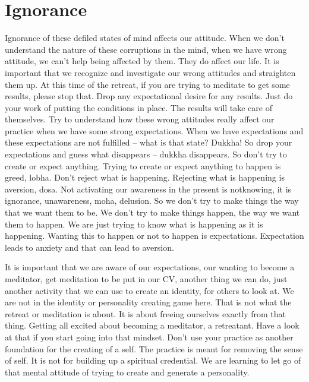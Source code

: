 \documentclass[letterpaper,10pt,english]{sphinxmanual}
\begin{document}
\section{Ignorance}
\label{\detokenize{4-b:ignorance}}
\sphinxAtStartPar
{} Ignorance of these defiled states of mind affects our attitude. When we
don’t understand the nature of these corruptions in the mind, when we have
wrong attitude, we can’t help being affected by them. They do affect our life.
It  is  important  that  we  recognize  and  investigate  our  wrong  attitudes  and
straighten them up. At this time of the retreat, if you are trying to meditate
to get some results, please stop that. Drop any expectational desire for any
results. Just do your work of putting the conditions in place. The results will
take care of themselves. Try to understand how these wrong attitudes really
affect our practice when we have some strong expectations. When we have
expectations  and  these  expectations  are  not  fulfilled  –  what  is  that  state?
Dukkha!  So  drop  your  expectations  and  guess  what  disappears  –  dukkha
disappears.  So  don’t  try  to  create  or  expect  anything.  Trying  to  create  or
expect anything to happen is greed, lobha. Don’t reject what is happening.
Rejecting what is happening is aversion, dosa. Not activating our awareness
in the present is not\sphinxhyphen{}knowing, it is ignorance, unawareness, moha, delusion.
So we don’t try to make things the way that we want them to be. We don’t
try  to  make  things  happen,  the  way  we  want  them  to  happen. We  are  just
trying to know what is happening as it is happening. Wanting this to happen
or not to happen is expectations. Expectation leads to anxiety and that can
lead to aversion.

\sphinxAtStartPar
It is important that we are aware of our expectations, our wanting to
become a meditator, get meditation to be put in our CV, another thing we
can do, just another activity that we can use to create an identity, for others
to look at. We are not in the identity or personality creating game here. That
is not what the retreat or meditation is about. It is about freeing ourselves
exactly from that thing. Getting all excited about becoming a meditator, a
retreatant. Have a look at that if you start going into that mind\sphinxhyphen{}set. Don’t use
your practice as another foundation for the creating of a self. The practice
is meant for removing the sense of self. It is not for building up a spiritual
credential. We are learning to let go of that mental attitude of trying to create
and generate a personality.
\end{document}
